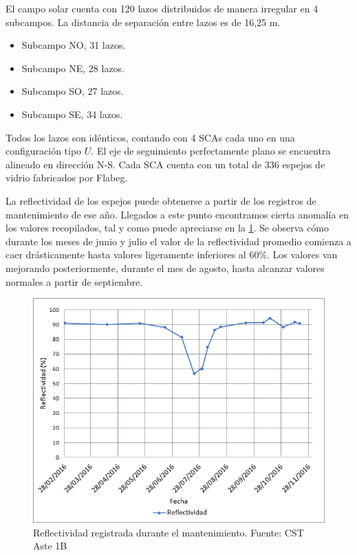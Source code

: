 El campo solar cuenta con 120 lazos distribuidos de manera irregular en 4 subcampos. La  distancia de separación entre lazos es de 16,25 m. 

\begin{itemize}[itemsep=2pt,parsep=2pt]
\item
  Subcampo NO, 31 lazos.
\item
  Subcampo NE, 28 lazos.
\item
  Subcampo SO, 27 lazos.
\item
  Subcampo SE, 34 lazos.
\end{itemize}

Todos los lazos son idénticos, contando con 4 SCAs cada uno en una configuración tipo \(U\). El eje de seguimiento perfectamente plano se encuentra alineado en dirección N-S. Cada SCA cuenta con un total de 336 espejos de vidrio fabricados por Flabeg. 

La reflectividad de los espejos puede obtenerse a partir de los registros de mantenimiento de ese año. Llegados a este punto encontramos cierta anomalía en los valores recopilados, tal y como puede apreciarse en la \ref{fig:reflectividad}. Se observa cómo durante los meses de junio y julio el valor de la reflectividad promedio comienza a caer drásticamente hasta valores ligeramente inferiores al 60\%. Los valores van mejorando posteriormente, durante el mes de agosto, hasta alcanzar valores normales a partir de septiembre.

\begin{figure}[H]
\includegraphics[width=0.9\linewidth]{images/reflectividad.png}
\caption[Reflectividad registrada durante el mantenimiento]{Reflectividad registrada durante el mantenimiento. Fuente: CST Aste 1B} 
\label{fig:reflectividad}
\end{figure}

